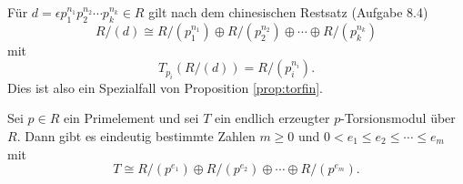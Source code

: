\documentclass{book}
\begin{document}
\begin{exa}
    \label{exa:chinese}
    Für $d = \epsilon p_1^{n_1} p_2^{n_2} \cdots p_k^{n_k} \in R$ gilt nach dem chinesischen Restsatz (Aufgabe 8.4) 
    \[
        R/(d) \cong R/(p_1^{n_1}) \oplus  R/(p_2^{n_2}) \oplus \cdots \oplus R/(p_k^{n_k})
    \]
    mit
    \[
        T_{p_i}(R/(d)) = R/(p_i^{n_i}).
    \]
    Dies ist also ein Spezialfall von Proposition \ref{prop:torfin}.
\end{exa}


\begin{thm}
    \label{thm:fghir}
    Sei $p \in R$ ein Primelement und sei $T$ ein endlich erzeugter
    $p$-Torsionsmodul über $R$. Dann gibt es eindeutig bestimmte Zahlen $m \ge 0$ und
    $0 < e_1 \le e_2 \le \cdots \le e_m$ mit
        \begin{equation}
            \label{eq:classification}
            T \cong R/(p^{e_1}) \oplus R/(p^{e_2}) \oplus \cdots \oplus R/(p^{e_m}).
        \end{equation}
\end{thm}
\end{document}
